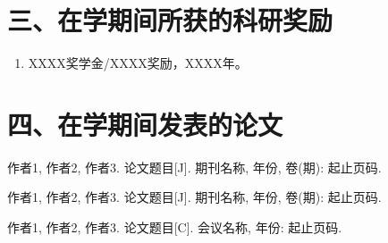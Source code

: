 \section*{三、在学期间所获的科研奖励}

\begin{enumerate}[label={（\arabic*）}, leftmargin=3em, itemsep=0.5\baselineskip]
  \item XXXX奖学金/XXXX奖励，XXXX年。
\end{enumerate}

\section*{四、在学期间发表的论文}

\begin{enumerate}[label={[\arabic*]}, leftmargin=3.2em, itemsep=0.6\baselineskip]
  \item 作者1, 作者2, 作者3. 论文题目[J]. 期刊名称, 年份, 卷(期): 起止页码.
  \item 作者1, 作者2, 作者3. 论文题目[J]. 期刊名称, 年份, 卷(期): 起止页码.
  \item 作者1, 作者2, 作者3. 论文题目[C]. 会议名称, 年份: 起止页码.
\end{enumerate}
